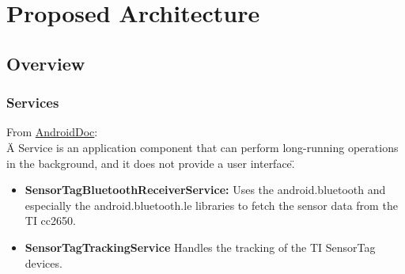 \section{Proposed Architecture}

\subsection{Overview}

\subsubsection{Services}
From \href{https://developer.android.com/guide/components/services.html}{AndroidDoc}: \\
\"A Service is an application component that can perform long-running operations in the background, and it does not provide a user interface\".
\begin{itemize}
  \item \textbf{SensorTagBluetoothReceiverService:} Uses the android.bluetooth and especially the android.bluetooth.le libraries to fetch the sensor data from the TI cc2650. \\
  \item \textbf{SensorTagTrackingService} Handles the tracking of the TI SensorTag devices.
\end{itemize}


